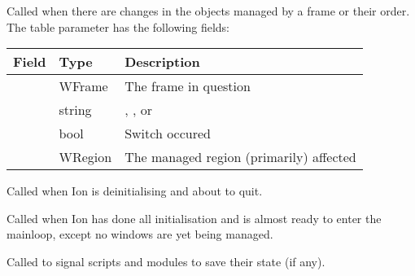 \begin{function}
    \begin{funcdesc}
      Called when there are changes in the objects managed by a frame
      or their order. The table parameter has the following fields:

      \begin{tabularx}{\linewidth}{llX}
          \hline
          Field & Type & Description \\
          \hline
          \var{reg} & WFrame & The frame in question \\
          \var{mode} & string & \var{"switchonly"}, \var{"reorder"},
                                \var{"add"} or \var{"remove"} \\
          \var{sw} & bool & Switch occured \\
          \var{sub} & WRegion & The managed region (primarily) affected \\
      \end{tabularx}
    \end{funcdesc}
\end{function}


\begin{function}
    \hookparams{()}
    \begin{funcdesc}
      Called when Ion is deinitialising and about to quit.
    \end{funcdesc}
\end{function}


\begin{function}
    \hookparams{()}
    \begin{funcdesc}
      Called when Ion has done all initialisation and is almost ready to
      enter the mainloop, except no windows are yet being managed.
    \end{funcdesc}
\end{function}


\begin{function}
    \hookparams{()}
    \begin{funcdesc}
      Called to signal scripts and modules to save their state (if any).
    \end{funcdesc}
\end{function}


